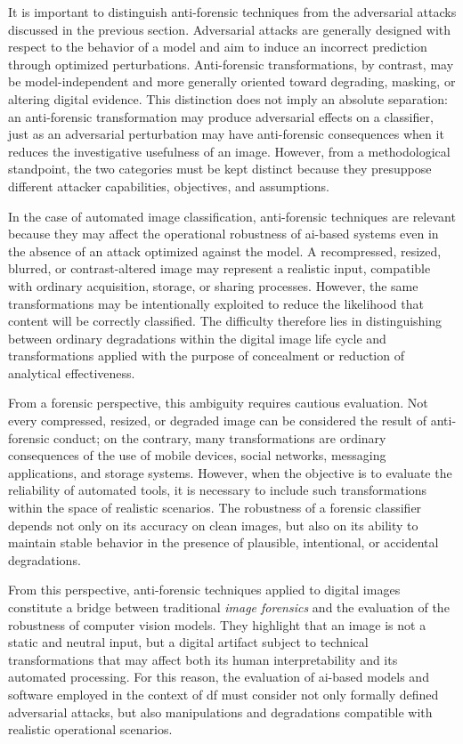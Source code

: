 It is important to distinguish anti-forensic techniques from the adversarial
attacks discussed in the previous section. Adversarial attacks are generally
designed with respect to the behavior of a model and aim to induce an incorrect
prediction through optimized perturbations. Anti-forensic transformations, by
contrast, may be model-independent and more generally oriented toward
degrading, masking, or altering digital evidence. This distinction does not
imply an absolute separation: an anti-forensic transformation may produce
adversarial effects on a classifier, just as an adversarial perturbation may
have anti-forensic consequences when it reduces the investigative usefulness of
an image. However, from a methodological standpoint, the two categories must be
kept distinct because they presuppose different attacker capabilities,
objectives, and assumptions.

In the case of automated image classification, anti-forensic techniques are
relevant because they may affect the operational robustness of \gls{ai}-based
systems even in the absence of an attack optimized against the model. A
recompressed, resized, blurred, or contrast-altered image may represent a
realistic input, compatible with ordinary acquisition, storage, or sharing
processes. However, the same transformations may be intentionally exploited to
reduce the likelihood that content will be correctly classified. The difficulty
therefore lies in distinguishing between ordinary degradations within the
digital image life cycle and transformations applied with the purpose of
concealment or reduction of analytical effectiveness.

From a forensic perspective, this ambiguity requires cautious evaluation. Not
every compressed, resized, or degraded image can be considered the result of
anti-forensic conduct; on the contrary, many transformations are ordinary
consequences of the use of mobile devices, social networks, messaging
applications, and storage systems. However, when the objective is to evaluate
the reliability of automated tools, it is necessary to include such
transformations within the space of realistic scenarios. The robustness of a
forensic classifier depends not only on its accuracy on clean images, but also
on its ability to maintain stable behavior in the presence of plausible,
intentional, or accidental degradations.

From this perspective, anti-forensic techniques applied to digital images
constitute a bridge between traditional \textit{image forensics} and the
evaluation of the robustness of computer vision models. They highlight that an
image is not a static and neutral input, but a digital artifact subject to
technical transformations that may affect both its human interpretability and
its automated processing. For this reason, the evaluation of \gls{ai}-based
models and software employed in the context of \gls{df} must consider not only
formally defined adversarial attacks, but also manipulations and degradations
compatible with realistic operational scenarios.



